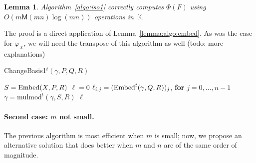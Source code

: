 \documentclass[12pt]{article}
\def\M {\ensuremath{\mathsf{M}}}
\def\K {\ensuremath{\mathbb{K}}}
\def\mulmod {\ensuremath{\mathrm{mulmod}}}
\newtheorem{Lemma}{Lemma}
\begin{document}
\begin{Lemma}
  Algorithm~\ref{algo:iso1} correctly computes $\Phi(F)$ using
  $O(m\M(mn)\log(mn))$ operations in~$\K$.
\end{Lemma}

The proof is a direct application of Lemma~\ref{lemma:algo:embed}.  As
was the case for $\varphi_X$, we will need the transpose of this
algorithm as well (todo: more explanations)
\begin{algorithm}[H]
  \caption{ChangeBasis1$^t(\gamma,P,Q,R)$}
  \begin{algorithmic}[1]
    \STATE $S={\rm Embed}(X,P,R)$
    \STATE $\ell=0$
    \STATE $\ell_{i,j} = ({\rm Embed}^t(\gamma,Q,R))_j$, {\bf for} $j=0,\dots,n-1$
    \STATE $\gamma = \mulmod^t(\gamma,S,R)$
    \ENDFOR
    \RETURN $\ell$
  \end{algorithmic}
  \label{algo:tiso1}
\end{algorithm}

\paragraph{Second case: $m$ not small.}
The previous algorithm is most efficient when $m$ is small; now, we
propose an alternative solution that does better when $m$ and $n$ are
of the same order of magnitude. 
\end{document}
